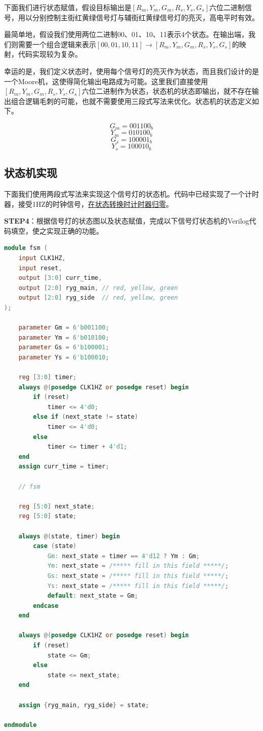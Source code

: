 \documentclass{ctexart}
\begin{document}
下面我们进行状态赋值，假设目标输出是$[R_m, Y_m, G_m, R_s, Y_s, G_s]$六位二进制信号，用以分别控制主街红黄绿信号灯与辅街红黄绿信号灯的亮灭，高电平时有效。

最简单地，假设我们使用两位二进制00、01、10、11表示4个状态。在输出端，我们则需要一个组合逻辑来表示$[00, 01, 10, 11] \rightarrow [R_m, Y_m, G_m, R_s, Y_s, G_s]$的映射，代码实现较为复杂。

幸运的是，我们定义状态时，使用每个信号灯的亮灭作为状态，而且我们设计的是一个Moore机，这使得简化输出电路成为可能。这里我们直接使用$[R_m, Y_m, G_m, R_s, Y_s, G_s]$六位二进制作为状态，状态机的状态即输出，就不存在输出组合逻辑毛刺的可能，也就不需要使用三段式写法来优化。状态机的状态定义如下。

$$ G_m = 001100_b $$
$$ Y_m = 010100_b $$
$$ G_s = 100001_b $$
$$ Y_s = 100010_b $$

\subsection{状态机实现}

下面我们使用两段式写法来实现这个信号灯的状态机。代码中已经实现了一个计时器，接受1HZ的时钟信号，\underline{在状态转换时计时器归零}。

\textbf{STEP4}：根据信号灯的状态图以及状态赋值，完成以下信号灯状态机的Verilog代码填空，使之实现正确的功能。

\begin{lstlisting}[language=Verilog]
module fsm (
    input CLK1HZ,
    input reset,
    output [3:0] curr_time,
    output [2:0] ryg_main, // red, yellow, green
    output [2:0] ryg_side  // red, yellow, green
);

    parameter Gm = 6'b001100;
    parameter Ym = 6'b010100;
    parameter Gs = 6'b100001;
    parameter Ys = 6'b100010;
 
    reg [3:0] timer;
    always @(posedge CLK1HZ or posedge reset) begin
        if (reset)
            timer <= 4'd0;
        else if (next_state != state)
            timer <= 4'd0;
        else
            timer <= timer + 4'd1;
    end
    assign curr_time = timer;

    // fsm
    
    reg [5:0] next_state;
    reg [5:0] state;
    
    always @(state, timer) begin
        case (state)
            Gm: next_state = timer == 4'd12 ? Ym : Gm;
            Ym: next_state = /***** fill in this field *****/;
            Gs: next_state = /***** fill in this field *****/;
            Ys: next_state = /***** fill in this field *****/;
            default: next_state = Gm;
        endcase
    end

    always @(posedge CLK1HZ or posedge reset) begin
        if (reset)
            state <= Gm;
        else
            state <= next_state;
    end

    assign {ryg_main, ryg_side} = state;

endmodule
\end{lstlisting}
\end{document}
